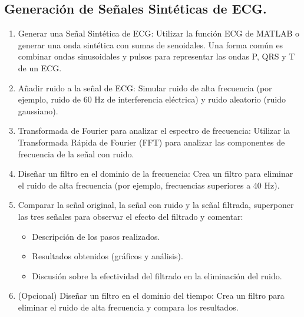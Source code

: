 \subsection{Generación de Señales Sintéticas de ECG.}

\begin{enumerate}
    \item Generar una Señal Sintética de ECG: Utilizar la función ECG de MATLAB o generar una 
    onda sintética con sumas de senoidales. Una forma común es combinar ondas sinusoidales y 
    pulsos para representar las ondas P, QRS y T de un ECG.
    \item Añadir ruido a la señal de ECG: Simular ruido de alta frecuencia (por ejemplo, ruido 
    de 60 Hz de interferencia eléctrica) y ruido aleatorio (ruido gaussiano).
    \item Transformada de Fourier para analizar el espectro de frecuencia: Utilizar la 
    Transformada Rápida de Fourier (FFT) para analizar las componentes de frecuencia de 
    la señal con ruido.
    \item Diseñar un filtro en el dominio de la frecuencia: Crea un filtro para eliminar 
    el ruido de alta frecuencia (por ejemplo, frecuencias superiores a 40 Hz).
    \item Comparar la señal original, la señal con ruido y la señal filtrada, superponer 
    las tres señales para observar el efecto del filtrado y comentar:
    \begin{itemize}
        \item Descripción de los pasos realizados.
        \item Resultados obtenidos (gráficos y análisis).
        \item Discusión sobre la efectividad del filtrado en la eliminación del ruido.
    \end{itemize}
    \item (Opcional) Diseñar un filtro en el dominio del tiempo: Crea un filtro para 
    eliminar el ruido de alta frecuencia y compara los resultados.
\end{enumerate}